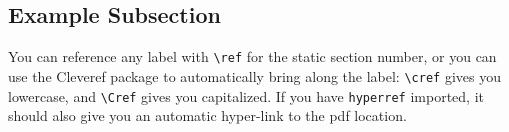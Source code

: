 \lipsum[1]

\subsection{Example Subsection}%
\label{sub:Example Subsection}

You can reference any label with \verb|\ref| for the static section number, or
you can use the Cleveref package to automatically bring along the label:
\verb|\cref| gives you lowercase, and \verb|\Cref| gives you capitalized. If
you have \verb|hyperref| imported, it should also give you an automatic
hyper-link to the pdf location.
\begin{center}
\end{center}


